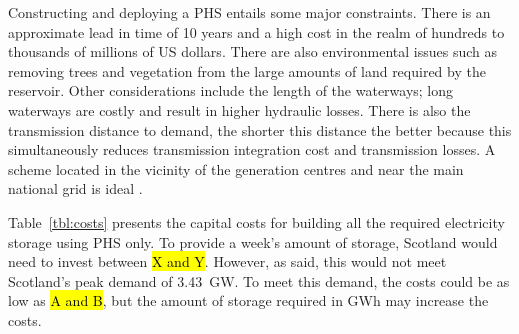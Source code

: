 
Constructing and deploying a PHS entails some major constraints. There is an
approximate lead in time of 10 years and a high cost in the realm of hundreds
to thousands of millions of US dollars. There are also environmental issues
such as removing trees and vegetation from the large amounts of land required
by the reservoir. Other considerations include the length of the waterways;
long waterways are costly and result in higher hydraulic losses. There is also
the transmission distance to demand, the shorter this distance the better
because this simultaneously reduces transmission integration cost and
transmission losses. A scheme located in the vicinity of the generation centres
and near the main national grid is ideal \citep{Louwinger2008}.

Table~\ref{tbl:costs} presents the capital costs for building all the required electricity storage using PHS only.
To provide a week's amount of storage, Scotland would need to invest between \hl{X and Y}.
However, as said, this would not meet Scotland's peak demand of 3.43~GW.
To meet this demand, the costs could be as low as \hl{A and B}, but the amount of storage required in GWh may increase the costs.





%
%


